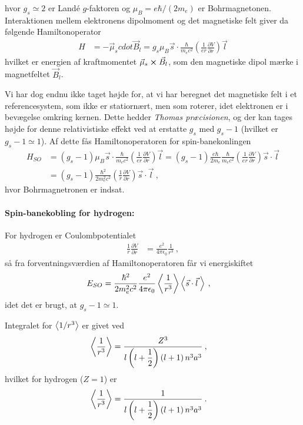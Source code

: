 hvor $g_s \simeq 2$ er Landé $g$-faktoren og $\mu_B = e\hbar/(2m_e)$ er Bohrmagnetonen.\\
Interaktionen mellem elektronens dipolmoment og det magnetiske felt giver da følgende Hamiltonoperator
\begin{align}
    H &= - \Vec{\mu}_s cdot \Vec{B}_l = g_s \mu_B \Vec{s} \cdot \frac{\hbar}{m_e c^2} \left(\frac{1}{e r} \frac{\partial V}{\partial r} \right) \Vec{l}
\end{align}
hvilket er energien af kraftmomentet $\Vec{\mu}_s \cross \Vec{B}_l$, som den magnetiske dipol mærke i magnetfeltet $\Vec{B}_l$.

Vi har dog endnu ikke taget højde for, at vi har beregnet det magnetiske felt i et referencesystem, som ikke er statiornært, men som roterer, idet elektronen er i bevægelse omkring kernen. Dette hedder \emph{Thomas præcisionen}, og der kan tages højde for denne relativistiske effekt ved at erstatte $g_s$ med $g_s - 1$ (hvilket er $g_s - 1 \simeq 1$). Af dette fås Hamiltonoperatoren for spin-banekonlingen
\begin{align}
    H_{SO} &= (g_s - 1) \mu_B \Vec{s} \cdot \frac{\hbar}{m_e c^2} \left(\frac{1}{e r} \frac{\partial V}{\partial r} \right) \Vec{l} = (g_s - 1) \frac{e\hbar}{2m_e} \frac{\hbar}{m_e c^2} \left(\frac{1}{e r} \frac{\partial V}{\partial r} \right) \Vec{s} \cdot \Vec{l} \nonumber\\
    &= (g_s - 1) \frac{\hbar^2}{2m_e^2c^2} \left(\frac{1}{r} \frac{\partial V}{\partial r} \right) \Vec{s} \cdot \Vec{l} \: ,
\end{align}
hvor Bohrmagnetronen er indsat.\\


\paragraph{Spin-banekobling for hydrogen:}
For hydrogen er Coulombpotentialet
\begin{align}
    \frac{1}{r} \frac{\partial V}{\partial r} &= \frac{e^2}{4\pi\epsilon_0} \frac{1}{r^3} \: ,
\end{align}
så fra forventningsværdien af Hamiltonoperatoren får vi energiskiftet
\begin{align}
    E_{SO} &= \frac{\hbar^2}{2m_e^2c^2} \frac{e^2}{4\pi\epsilon_0} \Braket{\frac{1}{r^3}} \Braket{\Vec{s} \cdot \Vec{l} \:} \: ,
\end{align}
idet det er brugt, at $g_s - 1 \simeq 1$.

Integralet for $\Braket{1/r^3}$ er givet ved
\begin{align}
    \Braket{\frac{1}{r^3}} &= \dfrac{Z^3}{l\left(l+\dfrac{1}{2}\right)\left(l + 1\right) n^3a^3} \: ,
\end{align}
hvilket for hydrogen ($Z = 1$) er
\begin{align} \label{eq:Q10_<1/r^3>ForHydrogen}
    \Braket{\frac{1}{r^3}} &= \dfrac{1}{l\left(l+\dfrac{1}{2}\right)\left(l + 1\right) n^3a^3} \: .
\end{align}

